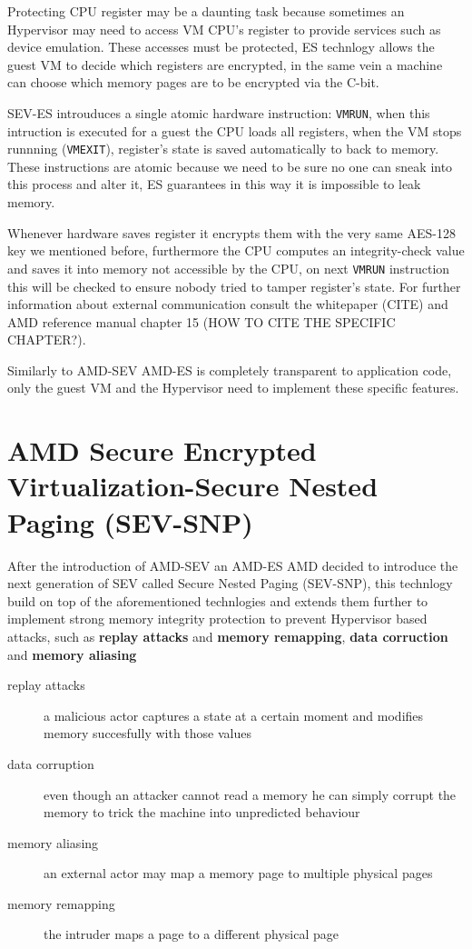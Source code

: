 \documentclass[twocolumn]{article}
\begin{document}
Protecting CPU register may be a daunting task because sometimes an Hypervisor may need to access VM CPU's register to provide services such as device emulation. These accesses must be protected, ES technlogy allows the guest VM to decide which registers are encrypted, in the same vein a machine can choose which memory pages are to be encrypted via the C-bit.

SEV-ES introuduces a single atomic hardware instruction: \texttt{VMRUN}, when this intruction is executed for a guest the CPU loads all registers, when the VM stops runnning (\texttt{VMEXIT}), register's state is saved automatically to  back to memory. These instructions are atomic because we need to be sure no one can sneak into this process and alter it, ES guarantees in this way it is impossible to leak memory.

Whenever hardware saves register it encrypts them with the very same AES-128 key we mentioned before, furthermore the CPU computes an integrity-check value and saves it into memory not accessible by the CPU, on next \texttt{VMRUN} instruction this will be checked to ensure nobody tried to tamper register's state. For further information about external communication consult the whitepaper (CITE) and AMD reference manual chapter 15 (HOW TO CITE THE SPECIFIC CHAPTER?).

Similarly to AMD-SEV AMD-ES is completely transparent to application code, only the guest VM and the Hypervisor need to implement these specific features.

\section{AMD Secure Encrypted Virtualization-Secure Nested Paging (SEV-SNP)}

After the introduction of AMD-SEV an AMD-ES AMD decided to introduce the next generation of SEV called Secure Nested Paging (SEV-SNP), this technlogy build on top of the aforementioned technlogies and extends them further to implement strong memory integrity protection to prevent Hypervisor based attacks, such as \textbf{replay attacks} and \textbf{memory remapping}, \textbf{data corruction} and \textbf{memory aliasing}

\begin{description}
    \item[replay attacks] a malicious actor captures a state at a certain moment and modifies memory succesfully with those values
    \item[data corruption]  even though an attacker cannot read a memory he can simply corrupt the memory to trick the machine into unpredicted behaviour
    \item[memory aliasing]  an external actor may map a memory page to multiple physical pages
    \item[memory remapping]  the intruder maps a page to a different physical page
\end{description}
\end{document}
